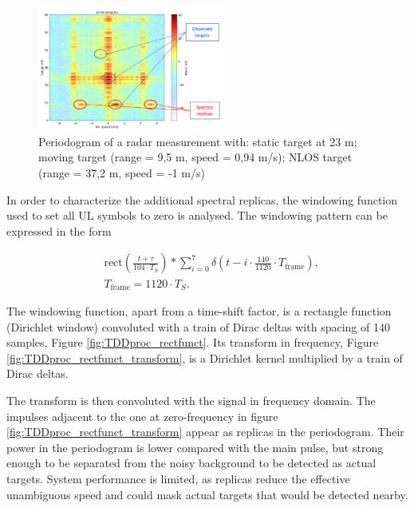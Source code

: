 \begin{figure}[H]
	\centering
	\includegraphics[width=0.55\textwidth]{Images/TDDprocessing/SpectralReplicasDLULpattern.png}
	\caption{Periodogram of a radar measurement with: static target at 23 m; moving target (range = 9,5 m, speed = 0,94 m/s); NLOS target (range = 37,2 m, speed = -1 m/s)}
	\label{fig:SpectralReplicasDLULpattern}
\end{figure}

In order to characterize the additional spectral replicas, the windowing function used to set all UL symbols to zero is analysed. The windowing pattern can be expressed in the form

\begin{align}
	&\text{rect}\left( \frac{t + \tau}{104 \cdot T_S}\right) \ast \sum_{i=0}^7 \delta\left( t - i\cdot \frac{140}{1120}\cdot T_{\text{frame}} \right),  \\
	&T_{\text{frame}} = 1120 \cdot T_S.
\end{align}

The windowing function, apart from a time-shift factor, is a rectangle function (Dirichlet window) convoluted with a train of Dirac deltas with spacing of 140 samples, Figure \ref{fig:TDDproc_rectfunct}. Its transform in frequency, Figure \ref{fig:TDDproc_rectfunct_transform}, is a Dirichlet kernel multiplied by a train of Dirac deltas.

The transform is then convoluted with the signal in frequency domain. The impulses adjacent to the one at zero-frequency in figure \ref{fig:TDDproc_rectfunct_transform} appear as replicas in the periodogram. Their power in the periodogram is lower compared with the main pulse, but strong enough to be separated from the noisy background to be detected as actual targets. System performance is limited, as replicas  reduce the effective unambiguous speed and could mask actual targets that would be detected nearby. 

